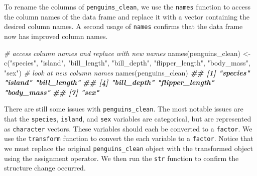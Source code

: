 \documentclass[
]{book}
\newenvironment{Shaded}{\begin{snugshade}}{\end{snugshade}}
\newcommand{\CommentTok}[1]{\textcolor[rgb]{0.56,0.35,0.01}{\textit{#1}}}
\newcommand{\DocumentationTok}[1]{\textcolor[rgb]{0.56,0.35,0.01}{\textbf{\textit{#1}}}}
\newcommand{\FunctionTok}[1]{\textcolor[rgb]{0.00,0.00,0.00}{#1}}
\newcommand{\NormalTok}[1]{#1}
\newcommand{\OtherTok}[1]{\textcolor[rgb]{0.56,0.35,0.01}{#1}}
\newcommand{\StringTok}[1]{\textcolor[rgb]{0.31,0.60,0.02}{#1}}
\theoremstyle{definition}
\theoremstyle{definition}
\theoremstyle{definition}
\theoremstyle{definition}
\theoremstyle{remark}
\begin{document}
To rename the columns of \texttt{penguins\_clean}, we use the \texttt{names} function to access the column names of the data frame and replace it with a vector containing the desired column names. A second usage of \texttt{names} confirms that the data frame now has improved column names.

\begin{Shaded}
\begin{Highlighting}[]
\CommentTok{\# access column names and replace with new names}
\FunctionTok{names}\NormalTok{(penguins\_clean) }\OtherTok{\textless{}{-}} \FunctionTok{c}\NormalTok{(}\StringTok{"species"}\NormalTok{, }\StringTok{"island"}\NormalTok{, }\StringTok{"bill\_length"}\NormalTok{, }\StringTok{"bill\_depth"}\NormalTok{, }\StringTok{"flipper\_length"}\NormalTok{, }\StringTok{"body\_mass"}\NormalTok{, }\StringTok{"sex"}\NormalTok{)}
\CommentTok{\# look at new column names}
\FunctionTok{names}\NormalTok{(penguins\_clean)}
\DocumentationTok{\#\# [1] "species"        "island"         "bill\_length"   }
\DocumentationTok{\#\# [4] "bill\_depth"     "flipper\_length" "body\_mass"     }
\DocumentationTok{\#\# [7] "sex"}
\end{Highlighting}
\end{Shaded}

There are still some issues with \texttt{penguins\_clean}. The most notable issues are that the \texttt{species}, \texttt{island}, and \texttt{sex} variables are categorical, but are represented as \texttt{character} vectors. These variables should each be converted to a \texttt{factor}. We use the \texttt{transform} function to convert the each variable to a \texttt{factor}. Notice that we must replace the original \texttt{penguins\_clean} object with the transformed object using the assignment operator. We then run the \texttt{str} function to confirm the structure change occurred.
\end{document}
